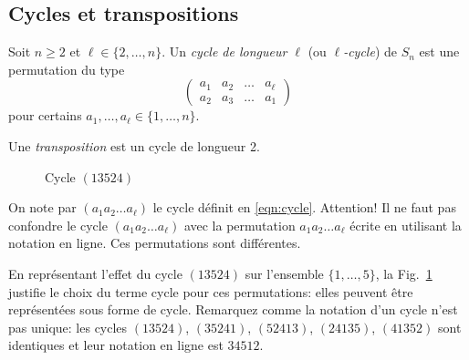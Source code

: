 \documentclass[french,course,oneside,theoremnosection]{lecture}
\begin{document}
\subsection{Cycles et transpositions}
\begin{definition}
Soit $n\geq 2$ et $\ell \in \{2, \ldots, n\}$. Un \emph{cycle de longueur $\ell$} (ou \emph{$\ell$-cycle}) de $S_n$ est une permutation du type
\begin{equation}\label{eqn:cycle}
\begin{pmatrix}
a_1 & a_2 & \ldots & a_\ell\\
a_2 & a_3 & \ldots & a_1
\end{pmatrix}
\end{equation}
pour certains $a_1, \ldots, a_\ell \in \{1, \ldots, n\}$. 

Une \emph{transposition} est un cycle de longueur 2.
\end{definition}

\begin{figure}
\centering
{}
\caption{Cycle $(13524)$}\label{fig:cycle}
\end{figure}


\begin{notation}
On note par $(a_1a_2\ldots a_\ell)$ le cycle définit en \eqref{eqn:cycle}. Attention! Il ne faut pas confondre le cycle $(a_1a_2\ldots a_\ell)$ avec la permutation $a_1a_2\ldots a_\ell$ écrite en utilisant la notation en ligne. Ces permutations sont différentes.

En représentant l'effet du cycle $(13524)$ sur l'ensemble $\{1,\ldots, 5\}$, la Fig.~\ref{fig:cycle} justifie le choix du terme cycle pour ces permutations: elles peuvent être représentées sous forme de cycle. Remarquez comme la notation d'un cycle n'est pas unique: les cycles $(13524)$, $(35241)$, $(52413)$, $(24135)$, $(41352)$ sont identiques et leur notation en ligne est $34512$.
\end{notation}
\end{document}
